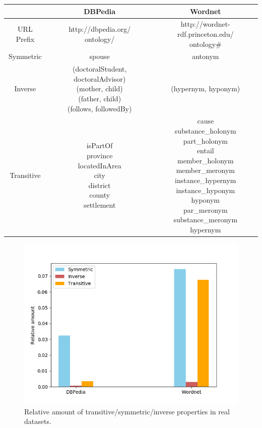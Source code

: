\begin{center}
	\begin{tabular}{|c|c|c|}
		\hline 
		& DBPedia & Wordnet \\ 
		\hline 
		URL Prefix & \makecell{http://dbpedia.org/\\ontology/} & \makecell{http://wordnet-rdf.princeton.edu/\\ontology\#} \\
		\hline
		Symmetric & spouse & antonym \\ 
		\hline 
		Inverse & \makecell{(doctoralStudent, doctoralAdvisor)\\(mother, child)\\(father, child) \\(follows, followedBy)} & (hypernym, hyponym) \\ 
		\hline 
		Transitive & \makecell{isPartOf\\province\\locatedInArea\\city\\district\\county\\settlement} & \makecell{cause\\substance\_holonym\\part\_holonym\\entail\\member\_holonym\\member\_meronym\\instance\_hypernym\\instance\_hyponym\\hyponym\\par\_meronym\\substance\_meronym\\hypernym} \\ 
		\hline 
	\end{tabular} 
	\label{tab:ontologyKnowledgeRelevantProperties}
\end{center}

\begin{figure}
	\centering
	\includegraphics[width=0.7\linewidth]{figures/4_evaluation/ontOccurrences}
	\caption{Relative amount of transitive/symmetric/inverse properties in real datasets.}
	\label{fig:ontoccurrences}
\end{figure}

